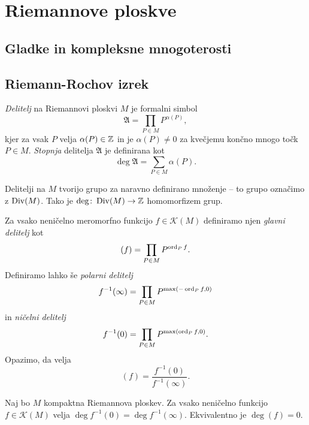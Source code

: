 \section{Riemannove ploskve}

\subsection{Gladke in kompleksne mnogoterosti}


\subsection{Riemann-Rochov izrek}

\begin{definicija}
\emph{Delitelj} na Riemannovi ploskvi $M$ je formalni simbol
\[
\mathfrak{A} = \prod_{P \in M} P^{\alpha(P)},
\]
kjer za vsak $P$ velja $\alpha(P) \in \mathbb{Z}$ in je $\alpha(P) \ne 0$
za kvečjemu končno mnogo točk $P \in M$. \emph{Stopnja} delitelja
$\mathfrak{A}$ je definirana kot
\[
\deg \mathfrak{A} = \sum_{P \in M} \alpha(P).
\]
\end{definicija}

Delitelji na $M$ tvorijo grupo za naravno definirano množenje --
to grupo označimo z $\operatorname{Div}(M)$. Tako je
$\deg \colon \operatorname{Div}(M) \to \mathbb{Z}$ homomorfizem grup.

Za vsako neničelno meromorfno funkcijo $f \in \mathscr{K}(M)$
definiramo njen \emph{glavni delitelj} kot
\[
(f) = \prod_{P \in M} P^{\operatorname{ord}_P f}.
\]
Definiramo lahko še \emph{polarni delitelj}
\[
f^{-1}(\infty) = \prod_{P \in M} P^{\max(-\operatorname{ord}_P f, 0)}
\]
in \emph{ničelni delitelj}
\[
f^{-1}(0) = \prod_{P \in M} P^{\max(\operatorname{ord}_P f, 0)}.
\]
Opazimo, da velja
\[
(f) = \frac{f^{-1}(0)}{f^{-1}(\infty)}.
\]

\begin{lema}
Naj bo $M$ kompaktna Riemannova ploskev. Za vsako neničelno
funkcijo $f \in \mathscr{K}(M)$ velja
$\deg f^{-1}(0) = \deg f^{-1}(\infty)$. Ekvivalentno je
$\deg (f) = 0$.
\end{lema}

